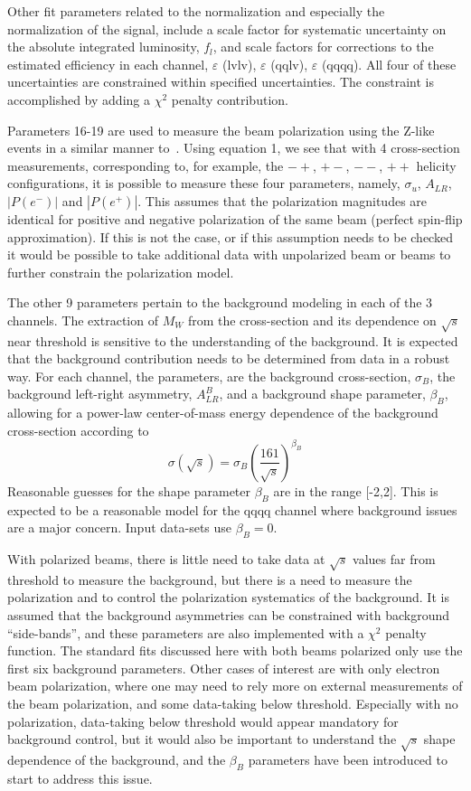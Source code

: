 \documentclass[12pt]{article}
\begin{document}
Other fit parameters related to the normalization and especially the normalization of the signal, include a scale factor for systematic 
uncertainty on the absolute integrated luminosity, $f_l$, and scale factors for 
corrections to the estimated efficiency in each channel, $\varepsilon$ (lvlv), $\varepsilon$ (qqlv), $\varepsilon$ (qqqq).
All four of these uncertainties are constrained within specified uncertainties. The constraint is accomplished by 
adding a $\chi^2$ penalty contribution.

Parameters 16-19 are used to measure the beam polarization using the Z-like events in a similar manner to~\cite{Blondel}. 
Using equation 1, we see that with 4 cross-section measurements, corresponding to, 
for example, the $-+$, $+-$, $--$, $++$ helicity configurations, it is possible to 
measure these four parameters, namely, $\sigma_u$, $A_{LR}$, $|P(e^{-})|$ and $|P(e^{+})|$. 
This assumes that the polarization magnitudes are identical for positive and negative polarization of the same 
beam (perfect spin-flip approximation). If this is not the case, or if 
this assumption needs to be checked it would be possible to take additional data with unpolarized beam or beams to further 
constrain the polarization model.

The other 9 parameters pertain to the background modeling in each of the 3 channels. 
The extraction of $M_W$ from the cross-section and its dependence on $\sqrt{s}$ near threshold 
is sensitive to the understanding of the background. 
It is expected that the background contribution needs to be  
determined from data in a robust way.
For each channel, the parameters, are the background cross-section, $\sigma_B$, 
the background left-right asymmetry, $A_{LR}^B $, and a background shape 
parameter, $\beta_B$, allowing for a power-law center-of-mass energy dependence of 
the background cross-section according to 
\[   \sigma(\sqrt{s}) = \sigma_B \left( \frac{161}{\sqrt{s}} \right)^{\beta_B} \]
Reasonable guesses for the shape parameter $\beta_B$ are in the range [-2,2]. 
This is expected to be a reasonable model for the qqqq channel where background issues 
are a major concern. Input data-sets use $\beta_B=0$. 

With polarized beams, there is little need to take data at $\sqrt{s}$ values far 
from threshold to measure the background, but there is a need to measure the 
polarization and to control the polarization systematics of the background. 
It is assumed that the background asymmetries can be constrained with background ``side-bands'', and these parameters 
are also implemented with a $\chi^2$ penalty function.
The standard fits 
discussed here with both beams polarized only use the first six background parameters.
Other cases of interest are with only electron beam polarization, where one may need to rely more 
on external measurements of the beam polarization, and some data-taking below threshold.
Especially with no polarization, data-taking below threshold would appear 
mandatory for background control, but it would also be important to understand the $\sqrt{s}$ 
shape dependence of the background, and the $\beta_B$ parameters have been introduced to start to address this issue.
\end{document}
